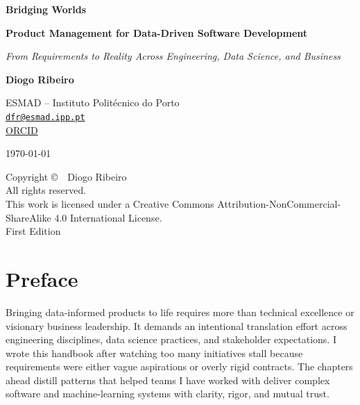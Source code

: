 \documentclass[11pt,a4paper,twoside,openright]{book}
\newcommand{\email}[1]{\href{mailto:#1}{\texttt{#1}}}
\newcommand{\orcid}[1]{\href{#1}{ORCID}}
\begin{document}
\frontmatter

\begin{titlepage}
    \centering
    \vspace*{2cm}

    {\Huge\bfseries\color{titlecolor} Bridging Worlds\par}
    \vspace{0.5cm}
    {\LARGE\bfseries Product Management for Data-Driven Software Development\par}
    \vspace{1cm}
    {\Large\itshape From Requirements to Reality Across Engineering, Data Science, and Business\par}

    \vfill

    {\Large\bfseries Diogo Ribeiro\par}
    \vspace{0.5cm}

    {\large
    ESMAD -- Instituto Politécnico do Porto\\
    \email{dfr@esmad.ipp.pt}\\[0.2cm]
    \orcid{https://orcid.org/0009-0001-2022-7072}
    \par}

    \vfill

    {\large \today\par}
\end{titlepage}

\thispagestyle{empty}
\null\vfill
\noindent
Copyright \copyright\ \the\year\ Diogo Ribeiro\\[0.5cm]
All rights reserved.\\[1cm]
\noindent
This work is licensed under a Creative Commons Attribution-NonCommercial-ShareAlike 4.0 International License.\\[1cm]

\noindent
First Edition\\[0.5cm]


\clearpage

\chapter*{Preface}

Bringing data-informed products to life requires more than technical excellence or visionary business leadership. It demands an intentional translation effort across engineering disciplines, data science practices, and stakeholder expectations. I wrote this handbook after watching too many initiatives stall because requirements were either vague aspirations or overly rigid contracts. The chapters ahead distill patterns that helped teams I have worked with deliver complex software and machine-learning systems with clarity, rigor, and mutual trust.
\end{document}

